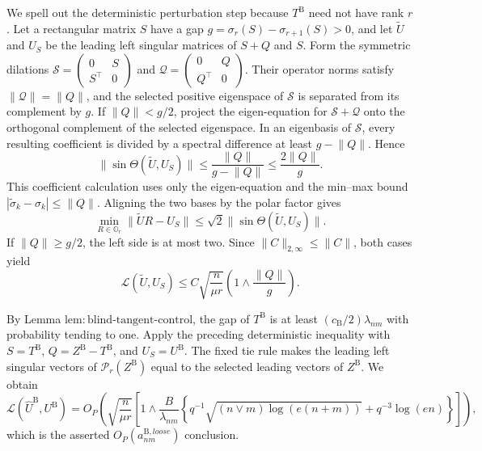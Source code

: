 We spell out the deterministic perturbation step because \(T^{\mathrm B}\) need not have rank \(r\).  Let a rectangular matrix \(S\) have a gap \(g=\sigma_r(S)-\sigma_{r+1}(S)>0\), and let \(\widetilde U\) and \(U_S\) be the leading left singular matrices of \(S+Q\) and \(S\).  Form the symmetric dilations \(\mathscr S=\left(\begin{smallmatrix}0&S\\S^\top&0\end{smallmatrix}\right)\) and \(\mathscr Q=\left(\begin{smallmatrix}0&Q\\Q^\top&0\end{smallmatrix}\right)\).  Their operator norms satisfy \(\lVert\mathscr Q\rVert=\lVert Q\rVert\), and the selected positive eigenspace of \(\mathscr S\) is separated from its complement by \(g\).  If \(\lVert Q\rVert<g/2\), project the eigen-equation for \(\mathscr S+\mathscr Q\) onto the orthogonal complement of the selected eigenspace.  In an eigenbasis of \(\mathscr S\), every resulting coefficient is divided by a spectral difference at least \(g-\lVert Q\rVert\).  Hence
\[
 \lVert\sin\Theta(\widetilde U,U_S)\rVert
 \le \frac{\lVert Q\rVert}{g-\lVert Q\rVert}
 \le\frac{2\lVert Q\rVert}{g}.
\]
This coefficient calculation uses only the eigen-equation and the min--max bound \(|\widetilde\sigma_k-\sigma_k|\le\lVert Q\rVert\).  Aligning the two bases by the polar factor gives
\[
 \min_{R\in\mathbb O_r}\lVert\widetilde U R-U_S\rVert
 \le\sqrt2\lVert\sin\Theta(\widetilde U,U_S)\rVert.
\]
If \(\lVert Q\rVert\ge g/2\), the left side is at most two.  Since \(\lVert C\rVert_{2,\infty}\le\lVert C\rVert\), both cases yield
\[
 \mathcal L(\widetilde U,U_S)
 \le C\sqrt{\frac n{\mu r}}
 \left(1\wedge\frac{\lVert Q\rVert}{g}\right).
\]

By Lemma \(\mathrm{lem:blind\mbox{-}tangent\mbox{-}control}\), the gap of \(T^{\mathrm B}\) is at least \((c_{\mathrm B}/2)\lambda_{nm}\) with probability tending to one.  Apply the preceding deterministic inequality with \(S=T^{\mathrm B}\), \(Q=Z^{\mathrm B}-T^{\mathrm B}\), and \(U_S=U^{\mathrm B}\).  The fixed tie rule makes the leading left singular vectors of \(\mathcal P_r(Z^{\mathrm B})\) equal to the selected leading vectors of \(Z^{\mathrm B}\).  We obtain
\[
 \mathcal L(\widehat U^{\mathrm B},U^{\mathrm B})
 =O_P\!\left(
 \sqrt{\frac n{\mu r}}\left[1\wedge
 \frac B{\lambda_{nm}}\left\{
 q^{-1}\sqrt{(n\vee m)\log(e(n+m))}
 +q^{-3}\log(en)\right\}\right]\right),
\]
which is the asserted \(O_P(a^{\mathrm B,loose}_{nm})\) conclusion.


